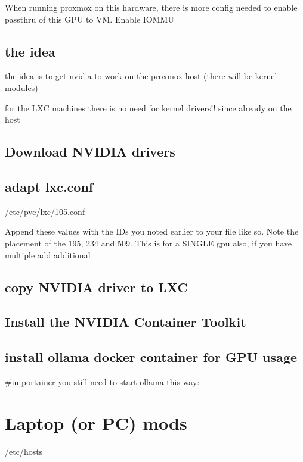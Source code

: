 \documentclass[letterpaper,10pt,english]{sphinxmanual}
\begin{document}
\sphinxAtStartPar
When running proxmox on this hardware, there is more config needed to enable passthru of this GPU to VM.
Enable IOMMU


\section{the idea}
\label{\detokenize{NVIDIA:the-idea}}
\sphinxAtStartPar
the idea is to get nvidia to work on the proxmox host (there will be kernel modules)

\sphinxAtStartPar
for the LXC machines there is no need for kernel drivers!! since already on the host


\section{Download NVIDIA drivers}
\label{\detokenize{NVIDIA:download-nvidia-drivers}}

\section{adapt lxc.conf}
\label{\detokenize{NVIDIA:adapt-lxc-conf}}
\sphinxAtStartPar
/etc/pve/lxc/105.conf

\sphinxAtStartPar
Append these values with the IDs you noted earlier to your file like so. Note the placement of the 195, 234 and 509. This is for a SINGLE gpu also, if you have multiple add additional


\section{copy NVIDIA driver to LXC}
\label{\detokenize{NVIDIA:copy-nvidia-driver-to-lxc}}

\section{Install the NVIDIA Container Toolkit}
\label{\detokenize{NVIDIA:install-the-nvidia-container-toolkit}}

\section{install ollama docker container for GPU usage}
\label{\detokenize{NVIDIA:install-ollama-docker-container-for-gpu-usage}}
\sphinxAtStartPar
\#in portainer you still need to start ollama this way:

\sphinxstepscope


\chapter{Laptop (or PC) mods}
\label{\detokenize{laptop:laptop-or-pc-mods}}\label{\detokenize{laptop::doc}}
\sphinxAtStartPar
/etc/hosts
\end{document}
